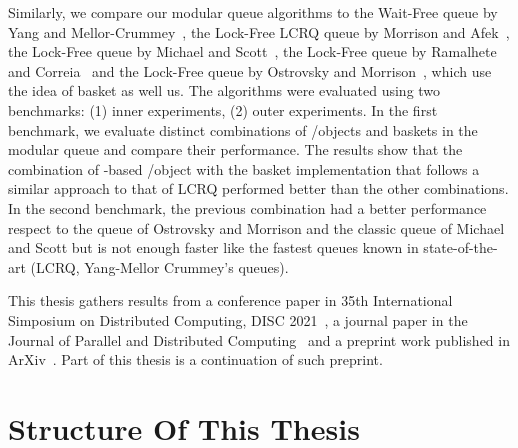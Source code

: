 Similarly, we compare our modular queue algorithms to the Wait-Free queue by Yang and Mellor-Crummey~\cite{DBLP_conf_ppopp_YangM16}, the Lock-Free LCRQ queue by Morrison and Afek~\cite{ppopp2013x86queues}, the Lock-Free queue by Michael and Scott~\cite{DBLP_conf_podc_MichaelS96}, the Lock-Free queue by Ramalhete and Correia~\cite{Ramalhete_Correia_MPMC_2016} and the Lock-Free queue by Ostrovsky and Morrison~\cite{scalingconcurrent2020}, which use the idea of basket as well us. The algorithms were evaluated using two benchmarks: (1) inner experiments, (2) outer experiments. In the first benchmark, we evaluate distinct combinations of \LL/\IC objects and baskets in the modular queue and compare their performance. The results show that the combination of \CAS-based \LL/\IC object with the basket implementation that follows a similar approach to that of LCRQ performed better than the other combinations. In the second benchmark, the previous combination had a better performance respect to the queue of Ostrovsky and Morrison and the classic queue of Michael and Scott but is not enough faster like the fastest queues known in state-of-the-art (LCRQ, Yang-Mellor Crummey's queues).

This thesis gathers results from a conference paper in 35th International Simposium on Distributed Computing, DISC 2021~\cite{DBLP_conf_wdag_CastanedaP21}, a journal paper in the Journal of Parallel and Distributed Computing~\cite{DBLP_journals_jpdc_CastanedaP24} and a preprint work published in ArXiv~\cite{arxiv_2205_06323}. Part of this thesis is a continuation of such preprint.
\section{\label{section:Organization}Structure Of This Thesis}

